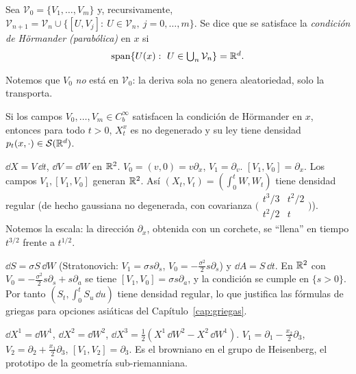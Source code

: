 \begin{definicion}
Sea $\mathcal V_0=\{V_1,\dots,V_m\}$ y, recursivamente, $\mathcal V_{n+1}=\mathcal V_n\cup\{[U,V_j]:\ U\in
\mathcal V_n,\ j=0,\dots,m\}$. Se dice que se satisface la \emph{condición de Hörmander (parabólica)} en $x$ si
\[
  \operatorname{span}\{U(x):\ U\in\textstyle\bigcup_n\mathcal V_n\}=\R^d.
\]
\end{definicion}

Notemos que $V_0$ \emph{no} está en $\mathcal V_0$: la deriva sola no genera aleatoriedad, solo la transporta.

\begin{teorema}\label{teo:hormander}
Si los campos $V_0,\dots,V_m\in C_b^\infty$
satisfacen la condición de Hörmander en $x$, entonces para todo $t>0$, $X_t^x$ es no degenerado
y su ley tiene densidad $p_t(x,\cdot)\in\mathcal S(\mathbb{R}^d)$.
\end{teorema}

\begin{ejemplo}[Kolmogorov]
$\dd X=V\,\dd t$, $\dd V=\dd W$ en $\mathbb{R}^2$. $V_0=(v,0)=v\partial_x$, $V_1=\partial_v$.
$[V_1,V_0]=\partial_x$. Los campos $V_1,[V_1,V_0]$ generan $\mathbb{R}^2$. Así $(X_t,V_t)=(\int_0^tW,W_t)$ tiene densidad
regular (de hecho gaussiana no degenerada, con covarianza $\big(\begin{smallmatrix}t^3/3&t^2/2\\t^2/2&t\end{smallmatrix}\big)$). Notemos la escala: la
dirección $\partial_x$, obtenida con un corchete, se ``llena'' en tiempo $t^{3/2}$ frente a $t^{1/2}$.
\end{ejemplo}

\begin{ejemplo}
$\dd S=\sigma S\,\dd W$ (Stratonovich: $V_1=\sigma s\partial_s$, $V_0=-\frac{\sigma^2}{2}s\partial_s$) y
$\dd A=S\,\dd t$. En $\mathbb{R}^2$ con $V_0=-\frac{\sigma^2}{2}s\partial_s+s\partial_a$ se tiene $[V_1,V_0]=\sigma s\partial_a$, y la condición se cumple en
$\{s>0\}$. Por tanto $(S_t,\int_0^tS_u\,\dd u)$ tiene densidad regular, lo que justifica las fórmulas de griegas
para opciones asiáticas del Capítulo~\ref{cap:griegas}.
\end{ejemplo}

\begin{ejemplo}
$\dd X^1=\dd W^1$, $\dd X^2=\dd W^2$, $\dd X^3=\frac12(X^1\,\dd W^2-X^2\,\dd W^1)$.
$V_1=\partial_1-\frac{x_2}{2}\partial_3$, $V_2=\partial_2+\frac{x_1}{2}\partial_3$, $[V_1,V_2]=\partial_3$. Es el browniano en el grupo de Heisenberg, el
prototipo de la geometría sub-riemanniana.
\end{ejemplo}

